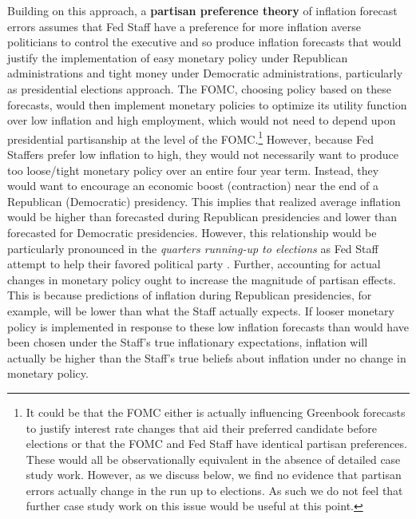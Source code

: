 \documentclass[a4paper]{article}\usepackage[]{graphicx}\usepackage[]{color}
\begin{document}
Building on this approach, a {\bf{partisan preference theory}} of inflation forecast errors assumes that Fed Staff have a preference for more inflation averse politicians to control the executive and so produce inflation forecasts that would justify the implementation of easy monetary policy under Republican administrations and tight money under Democratic administrations, particularly as presidential elections approach. The FOMC, choosing policy based on these forecasts, would then implement monetary policies to optimize its utility function over low inflation and high employment, which would not need to depend upon presidential partisanship at the level of the FOMC.\footnote{It could be that the FOMC either is actually influencing Greenbook forecasts to justify interest rate changes that aid their preferred candidate before elections or that the FOMC and Fed Staff have identical partisan preferences. These would all be observationally equivalent in the absence of detailed case study work. However, as we discuss below, we find no evidence that partisan errors actually change in the run up to elections. As such we do not feel that further case study work on this issue would be useful at this point.} However, because Fed Staffers prefer low inflation to high, they would not necessarily want to produce too loose/tight monetary policy over an entire four year term. Instead, they would want to encourage an economic boost (contraction) near the end of a Republican (Democratic) presidency. This implies that realized average inflation would be higher than forecasted during Republican presidencies and lower than forecasted for Democratic presidencies. However, this relationship would be particularly pronounced in the {\emph{quarters running-up to elections}} as Fed Staff attempt to help their favored political party \citep{Beck1987,Grier1987}. Further, accounting for actual changes in monetary policy ought to increase the magnitude of partisan effects. This is because predictions of inflation during Republican presidencies, for example, will be lower than what the Staff actually expects. If looser monetary policy is implemented in response to these low inflation forecasts than would have been chosen under the Staff's true inflationary expectations, inflation will actually be higher than the Staff's true beliefs about inflation under no change in monetary policy.
\end{document}
